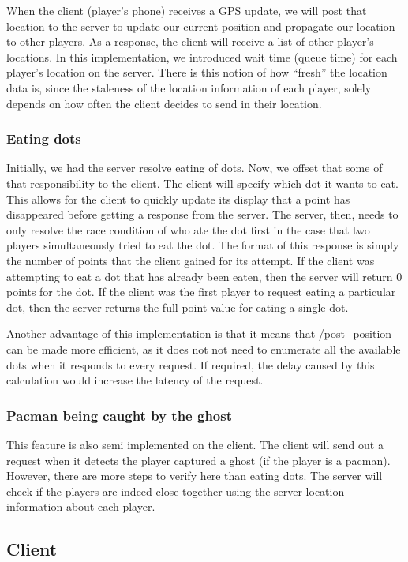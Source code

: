 \documentclass{acm_proc_article-sp}
\begin{document}
When the client (player's phone) receives a GPS update, we will post
that location to the server to update our current position and
propagate our location to other players. As a response, the client
will receive a list of other player's locations. In this
implementation, we introduced wait time (queue time) for each
player's location on the server. There is this notion of how ``fresh''
the location data is, since the staleness of the location information
of each player, solely depends on how often the client decides to send
in their location.

\subsubsection{Eating dots}
Initially, we had the server resolve eating of dots. Now, we offset
that some of that responsibility to the client. The client will
specify which dot it wants to eat.
This allows for the client to quickly update its display that a point
has disappeared before getting a response from the server.
The server, then, needs to only resolve the race condition of who ate
the dot first in the case that two players simultaneously tried
to eat the dot. The format of this response is simply the number of
points that the client gained for its attempt.
If the client was attempting to eat
a dot that has already been eaten, then the server will return 0
points for the dot. If the client was the first player to request eating
a particular dot, then the server returns the full point value for eating
a single dot.

Another advantage of this implementation is that it means that
\url{/post_position} can be made more efficient, as it does not not need to
enumerate all the available dots when it responds to every request.  If
required, the delay caused by this calculation would increase the latency of
the request.

\subsubsection{Pacman being caught by the ghost}
This feature is also semi implemented on the client. The client will
send out a request when it detects the player captured a ghost (if the
player is a pacman). However, there are more steps to verify here than
eating dots. The server will check if the players are indeed close
together using the server location information about each player.

\subsection{Client}
\end{document}
